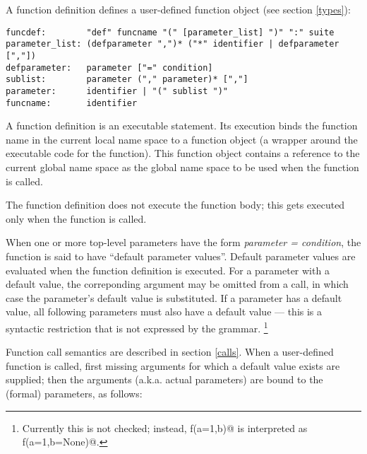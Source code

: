 A function definition defines a user-defined function object (see
section \ref{types}):

\begin{verbatim}
funcdef:        "def" funcname "(" [parameter_list] ")" ":" suite
parameter_list: (defparameter ",")* ("*" identifier | defparameter [","])
defparameter:   parameter ["=" condition]
sublist:        parameter ("," parameter)* [","]
parameter:      identifier | "(" sublist ")"
funcname:       identifier
\end{verbatim}

A function definition is an executable statement.  Its execution binds
the function name in the current local name space to a function object
(a wrapper around the executable code for the function).  This
function object contains a reference to the current global name space
as the global name space to be used when the function is called.

The function definition does not execute the function body; this gets
executed only when the function is called.

When one or more top-level parameters have the form {\em parameter =
condition}, the function is said to have ``default parameter values''.
Default parameter values are evaluated when the function definition is
executed.  For a parameter with a default value, the correponding
argument may be omitted from a call, in which case the parameter's
default value is substituted.  If a parameter has a default value, all
following parameters must also have a default value --- this is a
syntactic restriction that is not expressed by the grammar.%
\footnote{Currently this is not checked; instead,
\verb@def f(a=1,b)@ is interpreted as \verb@def f(a=1,b=None)@.}

Function call semantics are described in section \ref{calls}.  When a
user-defined function is called, first missing arguments for which a
default value exists are supplied; then the arguments (a.k.a. actual
parameters) are bound to the (formal) parameters, as follows:

